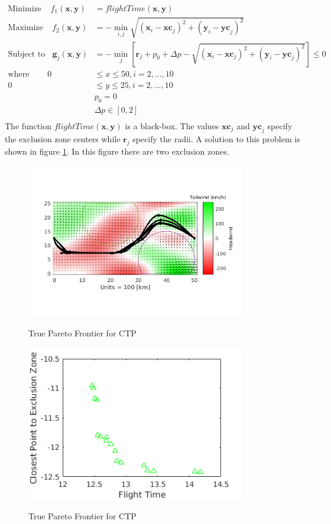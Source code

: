 \documentclass{article}
\begin{document}
\begin{align*}
\textrm{Minimize} ~~~~~ f_1(\textbf{x},\textbf{y}) &= flightTime(\textbf{x},\textbf{y})\\
\textrm{Maximize} ~~~~~ f_2(\textbf{x},\textbf{y}) &= -\min_{i,j}\sqrt{(\textbf{x}_i-\textbf{xc}_j)^2 + (\textbf{y}_i-\textbf{yc}_j)^2}\\
\textrm{Subject to} ~~~~ \textbf{g}_j(\textbf{x},\textbf{y}) &= -\min_{j}\left[\textbf{r}_j+p_0 + \Delta p -\sqrt{(\textbf{x}_i-\textbf{xc}_j)^2 + (\textbf{y}_i-\textbf{yc}_j)^2}\right]   \leq 0 \\
\textrm{where} ~~~~~~~~~~ 
0 &\leq  x \leq 50, i = 2,...,10 \\
0 &\leq  y  \leq 25, i = 2,...,10 \\
&p_0 = 0\\
&\Delta p \in [0,2] \\
\end{align*}
	The function $flightTime(\textbf{x},\textbf{y})$ is a black-box. The values $\textbf{xc}_j$ and  $\textbf{yc}_j$ specify the exclusion zone centers while $\textbf{r}_j$ specify the radii. A solution to this problem is shown in figure \ref{fig:FPP}.  In this figure there are two exclusion zones.
\begin{figure}[h]
  \caption{True Pareto Frontier for CTP}
  \centering
  \includegraphics[width=0.85\textwidth]{FPP.png}  
  \label{fig:FPP}
\end{figure}
	
\begin{figure}[h]
  \caption{True Pareto Frontier for CTP}
  \centering
  \includegraphics[width=0.85\textwidth]{FPP_pareto.png}  
  \label{fig:FPP_pareto}
\end{figure}
\end{document}
